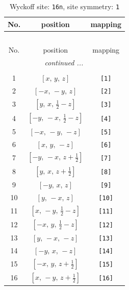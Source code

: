 \documentclass[fleqn,8pt]{jsarticle}
\begin{document}
\begin{longtable}{ccc}
\caption{Wyckoff site: {\tt 16n}, site symmetry: {\tt 1}}
 \\
 \hline \hline
No. & position & mapping \\ \hline \endfirsthead

\multicolumn{2}{l}{\tablename\ \thetable{}} \\
 \hline \hline
No. & position & mapping \\ \hline \endhead

 \hline \hline
\multicolumn{2}{r}{\footnotesize\it continued ...} \\ \endfoot

 \hline \hline
\multicolumn{2}{r}{} \\ \endlastfoot

1 & $\left[ x,\, y,\, z \right]$ & {\tt [1]} \\ \hline
2 & $\left[ - x,\, - y,\, z \right]$ & {\tt [2]} \\ \hline
3 & $\left[ y,\, x,\, \frac{1}{2} - z \right]$ & {\tt [3]} \\ \hline
4 & $\left[ - y,\, - x,\, \frac{1}{2} - z \right]$ & {\tt [4]} \\ \hline
5 & $\left[ - x,\, - y,\, - z \right]$ & {\tt [5]} \\ \hline
6 & $\left[ x,\, y,\, - z \right]$ & {\tt [6]} \\ \hline
7 & $\left[ - y,\, - x,\, z + \frac{1}{2} \right]$ & {\tt [7]} \\ \hline
8 & $\left[ y,\, x,\, z + \frac{1}{2} \right]$ & {\tt [8]} \\ \hline
9 & $\left[ - y,\, x,\, z \right]$ & {\tt [9]} \\ \hline
10 & $\left[ y,\, - x,\, z \right]$ & {\tt [10]} \\ \hline
11 & $\left[ x,\, - y,\, \frac{1}{2} - z \right]$ & {\tt [11]} \\ \hline
12 & $\left[ - x,\, y,\, \frac{1}{2} - z \right]$ & {\tt [12]} \\ \hline
13 & $\left[ y,\, - x,\, - z \right]$ & {\tt [13]} \\ \hline
14 & $\left[ - y,\, x,\, - z \right]$ & {\tt [14]} \\ \hline
15 & $\left[ - x,\, y,\, z + \frac{1}{2} \right]$ & {\tt [15]} \\ \hline
16 & $\left[ x,\, - y,\, z + \frac{1}{2} \right]$ & {\tt [16]} \\
\end{longtable}
\end{document}

